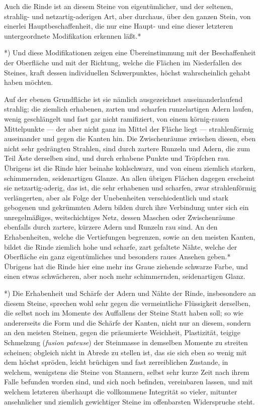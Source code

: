 \documentclass[a4paper, 11pt, oneside, german]{article}
\begin{document}
Auch die Rinde ist an diesem Steine von eigentümlicher, und der seltenen, strahlig- und netzartig-aderigen Art, aber durchaus, über den ganzen Stein, von einerlei Hauptbeschaffenheit, die nur eine Haupt- und eine dieser letzteren untergeordnete Modifikation erkennen läßt.*

*) Und diese Modifikationen zeigen eine Übereinstimmung mit der Beschaffenheit der Oberfläche und mit der Richtung, welche die Flächen im Niederfallen des Steines, kraft dessen individuellen Schwerpunktes, höchst wahrscheinlich gehabt haben möchten.

Auf der ebenen Grundfläche ist sie nämlich ausgezeichnet auseinanderlaufend strahlig; die ziemlich erhabenen, zarten und scharfen runzelartigen Adern laufen, wenig geschlängelt und fast gar nicht ramifiziert, von einem körnig-rauen Mittelpunkte --- der aber nicht ganz im Mittel der Fläche liegt --- strahlenförmig auseinander und gegen die Kanten hin. Die Zwischenräume zwischen diesen, eben nicht sehr gedrängten Strahlen, sind durch zartere Runzeln und Adern, die zum Teil Äste derselben sind, und durch erhabene Punkte und Tröpfchen rau. Übrigens ist die Rinde hier beinahe kohlschwarz, und von einem ziemlich starken, schimmernden, seidenartigen Glanze. An allen übrigen Flächen dagegen erscheint sie netzartig-aderig, das ist, die sehr erhabenen und scharfen, zwar strahlenförmig verlängerten, aber als Folge der Unebenheiten verschiedentlich und stark gebogenen und gekrümmten Adern bilden durch ihre Verbindung unter sich ein unregelmäßiges, weitschichtiges Netz, dessen Maschen oder Zwischenräume ebenfalls durch zartere, kürzere Adern und Runzeln rau sind. An den Erhabenheiten, welche die Vertiefungen begrenzen, sowie an den meisten Kanten, bildet die Rinde ziemlich hohe und scharfe, zart gefaltete Nähte, welche der Oberfläche ein ganz eigentümliches und besonders raues Ansehen geben.* Übrigens hat die Rinde hier eine mehr ins Graue ziehende schwarze Farbe, und einen etwas schwächeren, aber noch mehr schimmernden, seidenartigen Glanz.

*) Die Erhabenheit und Schärfe der Adern und Nähte der Rinde, insbesondere an diesem Steine, sprechen wohl sehr gegen die vermeintliche Flüssigkeit derselben, die selbst noch im Momente des Auffallens der Steine Statt haben soll; so wie andererseits die Form und die Schärfe der Kanten, nicht nur an diesem, sondern an den meisten Steinen, gegen die präsumierte Weichheit, Plastizität, teigige Schmelzung (\emph{fusion pateuse}) der Steinmasse in demselben Momente zu streiten scheinen; obgleich nicht in Abrede zu stellen ist, das sie sich eben so wenig mit dem höchst spröden, leicht brüchigen und fast zerreiblichen Zustande, in welchem, wenigstens die Steine von Stannern, selbst sehr kurze Zeit nach ihrem Falle befunden worden sind, und sich noch befinden, vereinbaren lassen, und mit welchem letzteren überhaupt die vollkommene Integrität so vieler, mitunter ansehnlicher und ziemlich gewichtiger Steine im offenbarsten Widerspruche steht.
\end{document}
